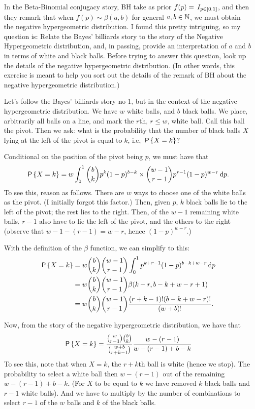 \documentclass[lectures]{subfiles}
\begin{document}
\begin{exercise}
In the Beta-Binomial conjugacy story, BH take as prior $f(p) = \1{p\in [0,1]}$, and then they remark that when $f(p) \sim \beta(a,b)$ for general $a, b \in \N$, we must obtain the negative hypergeometric distribution.
I found this pretty intriguing, so my question is: Relate the Bayes' billiards story to the story of the Negative Hypergeometric distribution, and, in passing, provide an interpretation of $a$ and $b$ in terms of white and black balls.
Before trying to answer this question, look up the details of the negative hypergeometric distribution.
(In other words, this exercise is meant to help you sort out the details of the remark of BH about the negative hypergeometric distribution.)
\begin{solution}
  Let's follow the Bayes' billiards story no 1, but in the context of the negative hypergeometric distribution.
  We have $w$ white balls, and $b$ black balls.
  We place, arbitrarily all balls on a line, and mark the $r$th, $r\leq w$, white ball.
  Call this ball the pivot.
  Then we ask:  what is the probability that the number of black balls $X$ lying at the left of the pivot is equal to $k$, i.e, $\P{X=k}$?

Conditional on the position of the pivot being $p$, we must have that
\begin{equation}
\label{eq:3}
\P{X=k} = w \int_0^1{b \choose k} p^k(1-p)^{b-k} \times {w -1 \choose r-1}p^{r-1} (1-p)^{w-r} \d p.
\end{equation}
To see this, reason as follows.
There are $w$ ways to choose one of the white balls as the pivot.
(I initially forgot this factor.)
Then, given $p$, $k$ black balls lie to the left of the pivot; the rest lies to the right.
Then, of the $w-1$ remaining white balls, $r-1$ also have to lie the left of the pivot, and the others to the right (observe that $w-1 - (r-1) = w -r$, hence $(1-p)^{w-r}$.)

With the definition of the  $\beta$ function, we can simplify to this:
\begin{align}
\label{eq:3}
\P{X=k}
&= w{b \choose k} {w -1 \choose r-1}  \int_0^1 p^{k+r-1}(1-p)^{b-k+w-r} \d p \\
&= w{b \choose k} {w -1 \choose r-1}  \beta(k+r, b-k+w-r + 1)\\
&= w{b \choose k} {w -1 \choose r-1} \frac{(r+k-1)! (b-k+w-r)!}{(w+b)!}.
\end{align}

Now, from the story of the negative hypergeometric distribution, we have that
\begin{align}
\P{X=k}
&= \frac{{w \choose r-1}{b \choose k}}{{w+b \choose r+k -1}}\frac{w-(r-1)}{w -(r-1) +b-k} \\
\end{align}
To see this, note that when $X=k$, the $r+k$th ball is white (hence we stop).
The probability to select a white ball then $w-(r-1)$ out of the remaining $w-(r-1) + b-k$.
(For $X$ to be equal to $k$ we have removed $k$ black balls and $r-1$ white balls).
And we have to multiply by the number of combinations to select $r-1$ of the $w$ balls and $k$ of the black balls.



\end{solution}
\end{exercise}
\end{document}

